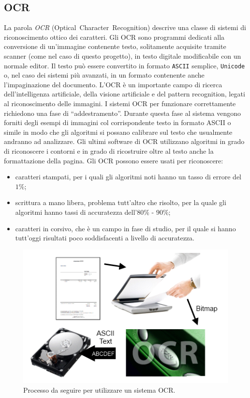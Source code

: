 \subsection{OCR}
	\label{subsec:ocr}
La parola \emph{OCR} (Optical~Character~Recognition) descrive una classe di sistemi di riconoscimento ottico dei caratteri.
Gli OCR sono programmi dedicati alla conversione di un'immagine contenente testo, solitamente acquisite tramite scanner (come nel caso di questo progetto), in testo digitale modificabile con un normale editor. Il testo può essere convertito in formato \texttt{ASCII} semplice, \texttt{Unicode} o, nel caso dei sistemi più avanzati, in un formato contenente anche l'impaginazione del documento.
L'OCR è un importante campo di ricerca dell'intelligenza artificiale, della visione artificiale e del pattern recognition, legati al riconoscimento delle immagini.
I sistemi OCR per funzionare correttamente richiedono una fase di ``addestramento''. Durante questa fase al sistema vengono forniti degli esempi di immagini col corrispondente testo in formato ASCII o simile in modo che gli algoritmi si possano calibrare sul testo che usualmente andranno ad analizzare. Gli ultimi software di OCR utilizzano algoritmi in grado di riconoscere i contorni e in grado di ricostruire oltre al testo anche la formattazione della pagina.
Gli OCR possono essere usati per riconoscere:
\begin{itemize}
	\item caratteri stampati, per i quali gli algoritmi noti hanno un tasso di errore del $1\%$;
	\item scrittura a mano libera, problema tutt'altro che risolto, per la quale gli algoritmi hanno tassi di accuratezza dell'$80\%$ - $90\%$;
	\item caratteri in corsivo, che è un campo in fase di studio, per il quale si hanno tutt'oggi risultati poco soddisfacenti a livello di accuratezza. 
\end{itemize}

	\begin{center}	
		\begin{figure}[H]
		\centering
		\includegraphics[scale=0.9]{Immagini/ocr}
		\caption[OCR]{Processo da seguire per utilizzare un sistema OCR.}
		\label{fig:ocr}
		\end{figure}
	\end{center}